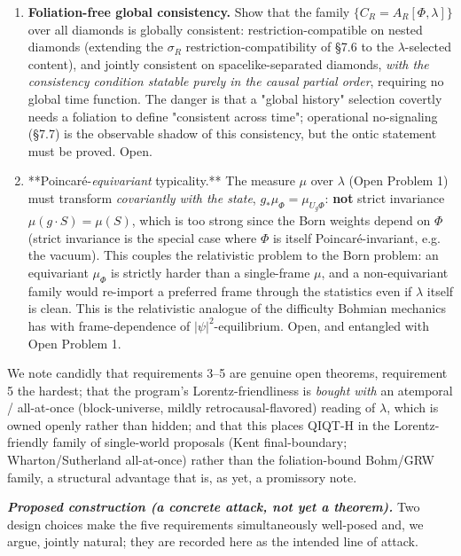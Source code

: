\documentclass[11pt,a4paper]{article}
\begin{document}
\begin{enumerate}
  \item \textbf{Foliation-free global consistency.} Show that the family $\{C_R = A_R[\Phi,\lambda]\}$ over all diamonds is globally consistent: restriction-compatible on nested diamonds (extending the $\sigma_R$ restriction-compatibility of §7.6 to the $\lambda$-selected content), and jointly consistent on spacelike-separated diamonds, \emph{with the consistency condition statable purely in the causal partial order}, requiring no global time function. The danger is that a "global history" selection covertly needs a foliation to define "consistent across time"; operational no-signaling (§7.7) is the observable shadow of this consistency, but the ontic statement must be proved. Open.
  \item **Poincaré-\emph{equivariant} typicality.** The measure $\mu$ over $\lambda$ (Open Problem 1) must transform \emph{covariantly with the state}, $g_*\mu_\Phi = \mu_{U_g\Phi}$: \textbf{not} strict invariance $\mu(g\cdot S)=\mu(S)$, which is too strong since the Born weights depend on $\Phi$ (strict invariance is the special case where $\Phi$ is itself Poincaré-invariant, e.g. the vacuum). This couples the relativistic problem to the Born problem: an equivariant $\mu_\Phi$ is strictly harder than a single-frame $\mu$, and a non-equivariant family would re-import a preferred frame through the statistics even if $\lambda$ itself is clean. This is the relativistic analogue of the difficulty Bohmian mechanics has with frame-dependence of $|\psi|^2$-equilibrium. Open, and entangled with Open Problem 1.
\end{enumerate}

We note candidly that requirements 3–5 are genuine open theorems, requirement 5 the hardest; that the program's Lorentz-friendliness is \emph{bought with} an atemporal / all-at-once (block-universe, mildly retrocausal-flavored) reading of $\lambda$, which is owned openly rather than hidden; and that this places QIQT-H in the Lorentz-friendly family of single-world proposals (Kent final-boundary; Wharton/Sutherland all-at-once) rather than the foliation-bound Bohm/GRW family, a structural advantage that is, as yet, a promissory note.

\emph{\textbf{Proposed construction (a concrete attack, not yet a theorem).}} Two design choices make the five requirements simultaneously well-posed and, we argue, jointly natural; they are recorded here as the intended line of attack.
\end{document}
